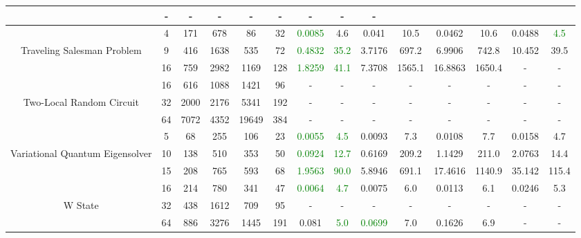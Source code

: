 \begin{table}[htb]
{\begin{tabular}{|c|c|c|c|c|c|c|c|c|c|c|c|c|c|}
 & - & -
 & - & -
 & - & -
 & - & -
 \\
\hline
 & 
4 & 171 & 678 & 86 & 32
 & \textcolor{green}{0.0085} & 4.6
 & 0.041 & 10.5
 & 0.0462 & 10.6
 & 0.0488 & \textcolor{green}{4.5}
 \\
Traveling Salesman Problem & 
9 & 416 & 1638 & 535 & 72
 & \textcolor{green}{0.4832} & \textcolor{green}{35.2}
 & 3.7176 & 697.2
 & 6.9906 & 742.8
 & 10.452 & 39.5
 \\
 & 
16 & 759 & 2982 & 1169 & 128
 & \textcolor{green}{1.8259} & \textcolor{green}{41.1}
 & 7.3708 & 1565.1
 & 16.8863 & 1650.4
 & - & -
 \\
\hline
 & 
16 & 616 & 1088 & 1421 & 96
 & - & -
 & - & -
 & - & -
 & - & -
 \\
Two-Local Random Circuit & 
32 & 2000 & 2176 & 5341 & 192
 & - & -
 & - & -
 & - & -
 & - & -
 \\
 & 
64 & 7072 & 4352 & 19649 & 384
 & - & -
 & - & -
 & - & -
 & - & -
 \\
\hline
 & 
5 & 68 & 255 & 106 & 23
 & \textcolor{green}{0.0055} & \textcolor{green}{4.5}
 & 0.0093 & 7.3
 & 0.0108 & 7.7
 & 0.0158 & 4.7
 \\
Variational Quantum Eigensolver & 
10 & 138 & 510 & 353 & 50
 & \textcolor{green}{0.0924} & \textcolor{green}{12.7}
 & 0.6169 & 209.2
 & 1.1429 & 211.0
 & 2.0763 & 14.4
 \\
 & 
15 & 208 & 765 & 593 & 68
 & \textcolor{green}{1.9563} & \textcolor{green}{90.0}
 & 5.8946 & 691.1
 & 17.4616 & 1140.9
 & 35.142 & 115.4
 \\
\hline
 & 
16 & 214 & 780 & 341 & 47
 & \textcolor{green}{0.0064} & \textcolor{green}{4.7}
 & 0.0075 & 6.0
 & 0.0113 & 6.1
 & 0.0246 & 5.3
 \\
W State & 
32 & 438 & 1612 & 709 & 95
 & - & -
 & - & -
 & - & -
 & - & -
 \\
 & 
64 & 886 & 3276 & 1445 & 191
 & 0.081 & \textcolor{green}{5.0}
 & \textcolor{green}{0.0699} & 7.0
 & 0.1626 & 6.9
 & - & -
 \\
\hline
\end{tabular}}
\end{table}